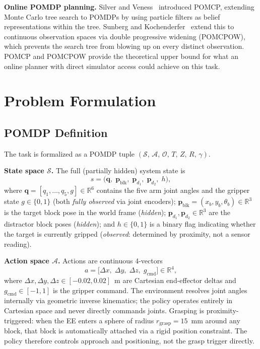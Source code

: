 \documentclass[conference]{IEEEtran}
\newcommand{\States}{\mathcal{S}}
\newcommand{\Actions}{\mathcal{A}}
\newcommand{\Obs}{\mathcal{O}}
\newcommand{\Trans}{T}
\newcommand{\Rew}{R}
\newcommand{\ObsFn}{Z}
\newcommand{\Disc}{\gamma}
\newcommand{\block}{\mathbf{p}_{\text{blk}}}
\begin{document}
\textbf{Online POMDP planning.}
Silver and Veness~\cite{silver2010pomcp} introduced POMCP, extending
Monte Carlo tree search to POMDPs by using particle filters as belief
representations within the tree.
Sunberg and Kochenderfer~\cite{sunberg2018pomcpow} extend this to
continuous observation spaces via double progressive widening (POMCPOW),
which prevents the search tree from blowing up on every distinct
observation.
POMCP and POMCPOW provide the theoretical upper bound for what an online
planner with direct simulator access could achieve on this task.

\section{Problem Formulation}
\label{sec:problem}

\subsection{POMDP Definition}

The task is formalized as a POMDP tuple
$(\States,\, \Actions,\, \Obs,\, \Trans,\, \ObsFn,\, \Rew,\, \Disc)$.

\textbf{State space $\States$.}
The full (partially hidden) system state is
\begin{equation}
  s = \bigl(\mathbf{q},\;\block,\;\mathbf{p}_{d_1},\;\mathbf{p}_{d_2},\;h\bigr),
  \label{eq:state}
\end{equation}
where $\mathbf{q}=[q_1,\ldots,q_5,g]\in\mathbb{R}^6$ contains the five arm
joint angles and the gripper state $g\in\{0,1\}$ (both \emph{fully
observed} via joint encoders); $\block=(x_b,y_b,\theta_b)\in\mathbb{R}^3$
is the target block pose in the world frame (\emph{hidden});
$\mathbf{p}_{d_1},\mathbf{p}_{d_2}\in\mathbb{R}^3$ are the distractor
block poses (\emph{hidden}); and $h\in\{0,1\}$ is a binary flag indicating
whether the target is currently gripped (\emph{observed}: determined
by proximity, not a sensor reading).

\textbf{Action space $\Actions$.}
Actions are continuous 4-vectors
\begin{equation}
  a = \bigl[\Delta x,\;\Delta y,\;\Delta z,\;g_{\text{cmd}}\bigr]\in\mathbb{R}^4,
\end{equation}
where $\Delta x,\Delta y,\Delta z\in[-0.02,0.02]$~m are Cartesian
end-effector deltas and $g_{\text{cmd}}\in[-1,1]$ is the gripper command.
The environment resolves joint angles internally via geometric inverse
kinematics; the policy operates entirely in Cartesian space and never
directly commands joints.
Grasping is proximity-triggered: when the EE enters a sphere of radius
$r_{\text{grasp}}=15$~mm around any block, that block is automatically
attached via a rigid position constraint.
The policy therefore controls approach and positioning, not the grasp
trigger directly.
\end{document}
